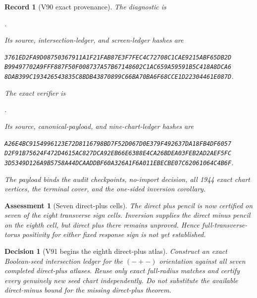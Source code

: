 \documentclass[11pt,oneside]{article}
\newtheorem{assessment}[theorem]{Assessment}
\newtheorem{record}[theorem]{Record}
\newtheorem{decision}[theorem]{Decision}
\theoremstyle{definition}
\theoremstyle{remark}
\begin{document}
\begin{record}[V90 exact provenance]
\label{rec:newv90-provenance}
The diagnostic is
\begin{center}\footnotesize
{}.
\end{center}
Its source, intersection-ledger, and screen-ledger hashes are
\begin{center}\scriptsize
\texttt{3761ED2FA9D08750367911A1F21FAB87E3F7FEC4C72708C1CAE9215ABF65DB2D}\\
\texttt{B99497702A9FFF887F50F008737A57B67148602C1AC659A59591B5C418A8DCA6}\\
\texttt{8DAB399C193426543835C8BDB43870899C66BA70BA6F68CCE1D22304461E087D}.
\end{center}
The exact verifier is
\begin{center}\footnotesize
{}.
\end{center}
Its source, canonical-payload, and nine-chart-ledger hashes are
\begin{center}\scriptsize
\texttt{A26E4BC9154996123E72D8116798BD7F52D067D0E379F492637DA18FB4DF6057}\\
\texttt{D2F91B75624F472D4615AC827DCA92EB66E6388E4CA26BDEA03FEB2AD2AEF5FC}\\
\texttt{3D5349D126A9B5758A44DCAADDBF60A326A1F6A011EBECBE07C62061064C4B6F}.
\end{center}
The payload binds the audit checkpoints, no-import decision, all
1944 exact chart vertices, the terminal cover, and the one-sided
inversion corollary.
\end{record}

\begin{assessment}[Seven direct-plus cells]
\label{ass:newv90}
The direct plus pencil is now certified on seven of the eight
transverse sign cells.  Inversion supplies the direct minus pencil
on the eighth cell, but direct plus there remains unproved.  Hence
full-transverse-torus positivity for either fixed response sign is
not yet established.
\end{assessment}

\begin{decision}[V91 begins the eighth direct-plus atlas]
\label{dec:newv90-next}
Construct an exact Boolean-seed intersection ledger for the
\((-+-)\) orientation against all seven completed direct-plus
atlases.  Reuse only exact full-radius matches and certify every
genuinely new seed chart independently.  Do not substitute the
available direct-minus bound for the missing direct-plus theorem.
\end{decision}
\end{document}
